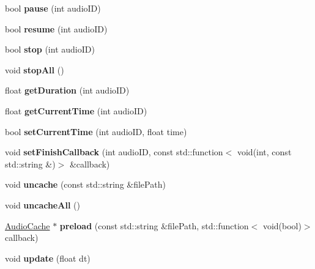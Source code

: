\begin{DoxyCompactItemize}
bool {\bfseries pause} (int audio\+ID)
\item 
\mbox{\label{classexperimental_1_1AudioEngineImpl_a8c82f937ac18f6f3fcaa7320e1df44bd}} 
bool {\bfseries resume} (int audio\+ID)
\item 
\mbox{\label{classexperimental_1_1AudioEngineImpl_a8a71d322330c0db9eea78e0813de3d26}} 
bool {\bfseries stop} (int audio\+ID)
\item 
\mbox{\label{classexperimental_1_1AudioEngineImpl_a8961e9bb715fece5dfaeca64d64c06d9}} 
void {\bfseries stop\+All} ()
\item 
\mbox{\label{classexperimental_1_1AudioEngineImpl_ac5f8f652fbe1a06d7dde14db43b644ec}} 
float {\bfseries get\+Duration} (int audio\+ID)
\item 
\mbox{\label{classexperimental_1_1AudioEngineImpl_a3cb4f3a9c621d7f4ad6f5b57b4ba6cb6}} 
float {\bfseries get\+Current\+Time} (int audio\+ID)
\item 
\mbox{\label{classexperimental_1_1AudioEngineImpl_a966a526ab11d36c96fd4d75c1774ddda}} 
bool {\bfseries set\+Current\+Time} (int audio\+ID, float time)
\item 
\mbox{\label{classexperimental_1_1AudioEngineImpl_a578dff2b3739e11ff78c2fb66202b9ae}} 
void {\bfseries set\+Finish\+Callback} (int audio\+ID, const std\+::function$<$ void(int, const std\+::string \&)$>$ \&callback)
\item 
\mbox{\label{classexperimental_1_1AudioEngineImpl_a34563b43f0528bca2bb16b4d9e2ba423}} 
void {\bfseries uncache} (const std\+::string \&file\+Path)
\item 
\mbox{\label{classexperimental_1_1AudioEngineImpl_add63d1604ba7c93d09f3ccb8d61cd5d0}} 
void {\bfseries uncache\+All} ()
\item 
\mbox{\label{classexperimental_1_1AudioEngineImpl_a9bc8c8d1535cb237da0a8f6ab4185395}} 
\hyperlink{classexperimental_1_1AudioCache}{Audio\+Cache} $\ast$ {\bfseries preload} (const std\+::string \&file\+Path, std\+::function$<$ void(bool)$>$ callback)
\item 
\mbox{\label{classexperimental_1_1AudioEngineImpl_a52f2b0ed6a73b5606f722a05e9b934ce}} 
void {\bfseries update} (float dt)
\end{DoxyCompactItemize}


